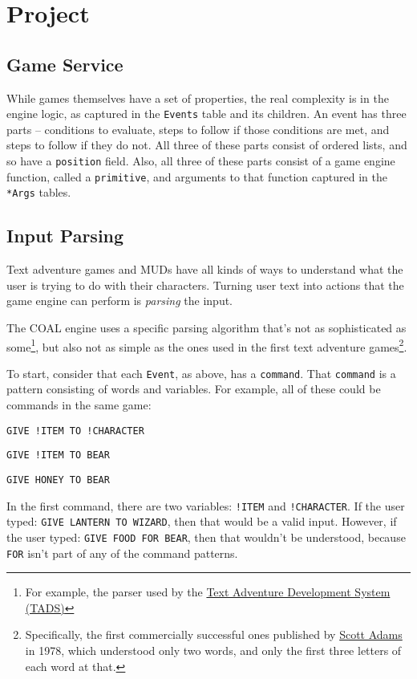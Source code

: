 \documentclass{article}
\newcommand{\enterProblemHeader}[1]{
}
\newcommand{\exitProblemHeader}[1]{
\nobreak\extramarks{#1}{}\nobreak
}
\newcounter{homeworkProblemCounter} %
\newcommand{\homeworkProblemName}{}
\newenvironment{homeworkProblem}[1][Problem \arabic{homeworkProblemCounter}]{ %
\stepcounter{homeworkProblemCounter} %
\renewcommand{\homeworkProblemName}{#1} %
\section{\homeworkProblemName} %
\enterProblemHeader{\homeworkProblemName} %
}{
\exitProblemHeader{\homeworkProblemName} %
}
\newcommand{\homeworkSectionName}{}
\newenvironment{homeworkSection}[1]{ %
\renewcommand{\homeworkSectionName}{#1} %
\subsection{\homeworkSectionName} %
\enterProblemHeader{\homeworkProblemName\ [\homeworkSectionName]} %
}{
\enterProblemHeader{\homeworkProblemName} %
}
\begin{document}
\begin{homeworkProblem}[Project]
\begin{homeworkSection}{Game Service}
	While games themselves have a set of properties, the real complexity is in the engine logic, as captured in the \texttt{Events} table and its children. An event has three parts -- conditions to evaluate, steps to follow if those conditions are met, and steps to follow if they do not. All three of these parts consist of ordered lists, and so have a \texttt{position} field. Also, all three of these parts consist of a game engine function, called a \texttt{primitive}, and arguments to that function captured in the \texttt{*Args} tables.

\end{homeworkSection}

\begin{homeworkSection}{Input Parsing}
	Text adventure games and MUDs have all kinds of ways to understand what the user is trying to do with their characters. Turning user text into actions that the game engine can perform is \textit{parsing} the input.

	The COAL engine uses a specific parsing algorithm that's not as sophisticated as some\footnote{For example, the parser used by the \href{http://www.tads.org/t2doc/doc/parser.htm}{Text Adventure Development System (TADS)}}, but also not as simple as the ones used in the first text adventure games\footnote{Specifically, the first commercially successful ones published by \href{https://en.wikipedia.org/wiki/Scott_Adams_(game_designer)}{Scott Adams} in 1978, which understood only two words, and only the first three letters of each word at that.}.

	To start, consider that each \texttt{Event}, as above, has a \texttt{command}. That \texttt{command} is a pattern consisting of words and variables. For example, all of these could be commands in the same game:

	\begin{compactitem}
		\item \texttt{GIVE !ITEM TO !CHARACTER}
		\item \texttt{GIVE !ITEM TO BEAR}
		\item \texttt{GIVE HONEY TO BEAR}
	\end{compactitem}

	In the first command, there are two variables: \texttt{!ITEM} and \texttt{!CHARACTER}. If the user typed: \texttt{GIVE LANTERN TO WIZARD}, then that would be a valid input. However, if the user typed: \texttt{GIVE FOOD FOR BEAR}, then that wouldn't be understood, because \texttt{FOR} isn't part of any of the command patterns.


\end{homeworkSection}
\end{homeworkProblem}
\end{document}
